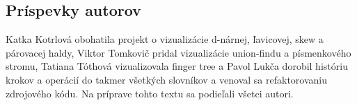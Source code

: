 \subsection{Príspevky autorov}
Katka Kotrlová obohatila projekt o vizualizácie d-nárnej, ľavicovej, skew a
párovacej haldy, Viktor Tomkovič pridal vizualizácie union-findu a písmenkového
stromu, Tatiana Tóthová vizualizovala finger tree a Pavol Lukča dorobil históriu
krokov a operácií do takmer všetkých slovníkov a venoval sa refaktorovaniu
zdrojového kódu. Na príprave tohto textu sa podieľali všetci autori.

